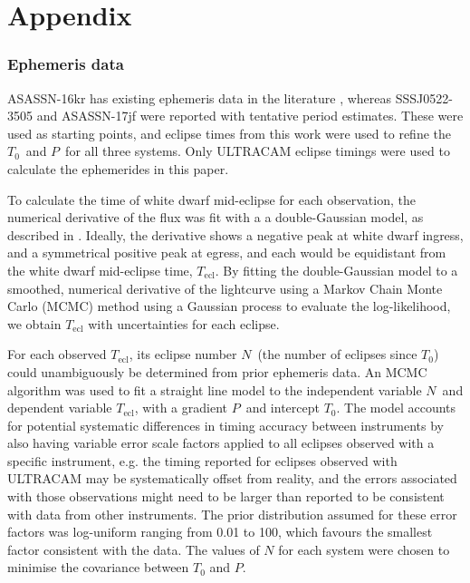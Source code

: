 

\chapter{Appendix}
\label{app:my_appendix}




\subsection{Ephemeris data}
\label{sect:ephemeris data}

ASASSN-16kr has existing ephemeris data in the literature \citep{kato2017}, whereas SSSJ0522-3505 and ASASSN-17jf were reported with tentative period estimates. These were used as starting points, and eclipse times from this work were used to refine the $T_\mathrm{0}$\ and $P$\ for all three systems. Only ULTRACAM eclipse timings were used to calculate the ephemerides in this paper.

To calculate the time of white dwarf mid-eclipse for each observation, the numerical derivative of the flux was fit with a a double-Gaussian model, as described in \citet{wood1985}.
Ideally, the derivative shows a negative peak at white dwarf ingress, and a symmetrical positive peak at egress, and each would be equidistant from the white dwarf mid-eclipse time, $T_\mathrm{ecl}$. By fitting the double-Gaussian model to a smoothed, numerical derivative of the lightcurve using a Markov Chain Monte Carlo (MCMC) method using a Gaussian process to evaluate the log-likelihood, we obtain $T_\mathrm{ecl}$ with uncertainties for each eclipse.

For each observed $T_\mathrm{ecl}$, its eclipse number $N$\ (the number of eclipses since $T_0$) could unambiguously be determined from prior ephemeris data. 
An MCMC algorithm was used to fit a straight line model to the independent variable $N$\ and dependent variable $T_\mathrm{ecl}$, with a gradient $P$\ and intercept $T_0$. The model accounts for potential systematic differences in timing accuracy between instruments by also having variable error scale factors applied to all eclipses observed with a specific instrument, e.g. the timing reported for eclipses observed with ULTRACAM may be systematically offset from reality, and the errors associated with those observations might need to be larger than reported to be consistent with data from other instruments. The prior distribution assumed for these error factors was log-uniform ranging from 0.01 to 100, which favours the smallest factor consistent with the data. The values of $N$ for each system were chosen to minimise the covariance between $T_0$ and $P$.


